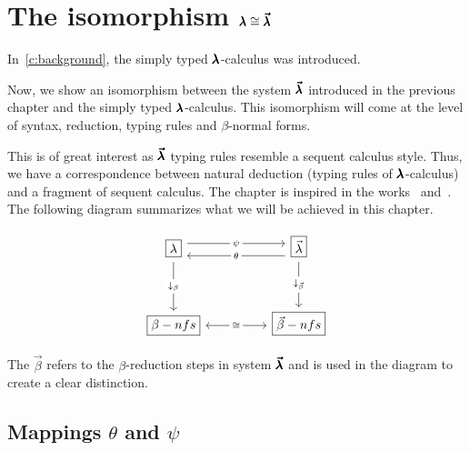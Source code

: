 \chapter{The isomorphism $\pmb{\lambda} \cong \pmb{\vec \lambda}$}
\label{c:isomorphism}
In~\cref{c:background}, the simply typed $\pmb{\lambda}$-calculus was introduced.

Now, we show an isomorphism between the system $\pmb{\vec \lambda}$ introduced in the previous chapter and the simply typed $\pmb{\lambda}$-calculus.
This isomorphism will come at the level of syntax, reduction, typing rules and $\beta$-normal forms.

This is of great interest as $\pmb{\vec \lambda}$ typing rules resemble a sequent calculus style.
Thus, we have a correspondence between natural deduction (typing rules of $\pmb{\lambda}$-calculus) and a fragment of sequent calculus.
The chapter is inspired in the works~\cite{LuisDychkoff} and~\cite[Chapter~4]{JCES2002}.
The following diagram summarizes what we will be achieved in this chapter.

\[\begin{tikzcd}
    {\boxed\lambda} && {\boxed{\vec \lambda}} \\
    \\
    {\boxed{\small{\beta-nfs}}} && {\boxed{\small{\vec \beta-nfs}}}
    \arrow["\psi"{description}, shift left=2, from=1-1, to=1-3]
    \arrow["{\downarrow_\beta}"{description}, from=1-1, to=3-1]
    \arrow["\theta"{description}, shift left=2, from=1-3, to=1-1]
    \arrow["{\downarrow_{\vec \beta}}"{description}, from=1-3, to=3-3]
    \arrow["\cong"{description}, <->, from=3-1, to=3-3]
  \end{tikzcd}\]

The $\vec \beta$ refers to the $\beta$-reduction steps in system $\pmb{\vec \lambda}$ and is used in the diagram to create a clear distinction.

\section{Mappings $\theta$ and $\psi$}

